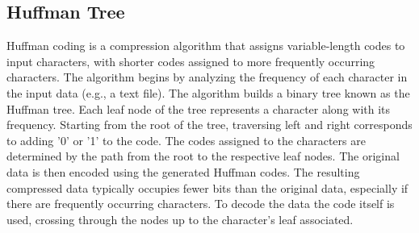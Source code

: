 \documentclass[main.tex]{subfiles}
\begin{document}
\subsection{Huffman Tree} \label{sec:introduction_huffman}
Huffman coding is a compression algorithm that assigns variable-length codes to input characters, with shorter codes assigned to more frequently occurring characters. The algorithm begins by analyzing the frequency of each character in the input data (e.g., a text file). The algorithm builds a binary tree known as the Huffman tree. Each leaf node of the tree represents a character along with its frequency. Starting from the root of the tree, traversing left and right corresponds to adding '0' or '1' to the code. The codes assigned to the characters are determined by the path from the root to the respective leaf nodes. The original data is then encoded using the generated Huffman codes. The resulting compressed data typically occupies fewer bits than the original data, especially if there are frequently occurring characters. To decode the data the code itself is used, crossing through the nodes up to the character's leaf associated.\cite{Huffman_coding}
\end{document}
